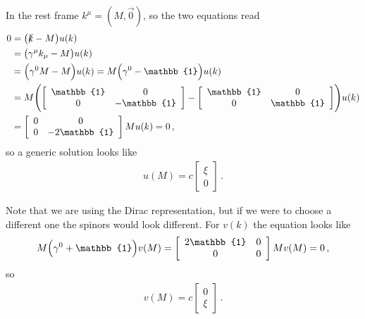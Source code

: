 \documentclass[main.tex]{subfiles}
\begin{document}
In the rest frame \(k^{\mu } = (M, \vec{0})\), so the two equations read 
%
\begin{subequations}
\begin{align}
0&= \qty(\slashed{k} - M) u(k)  \\
&= \qty(\gamma^{\mu }k_{\mu } - M) u(k)  \\
&= \qty(\gamma^{0} M - M ) u(k) = M \qty(\gamma^{0} - \mathbb{1}) u(k)  \\
&=M\qty( \left[\begin{array}{cc}
\mathbb{1} & 0 \\ 
0 & -\mathbb{1}
\end{array}\right] 
-
\left[\begin{array}{cc}
\mathbb{1} & 0 \\ 
0 & \mathbb{1}
\end{array}\right]
) u(k)  \\
&= \left[\begin{array}{cc}
0 & 0 \\ 
0 & -2 \mathbb{1}
\end{array}\right] M u(k) =0
\,,
\end{align}
\end{subequations}
%
so a generic solution looks like 
%
\begin{subequations}
\begin{align}
u(M) = c \left[\begin{array}{c}
\xi  \\ 
0
\end{array}\right]
\,.
\end{align}
\end{subequations}

Note that we are using the Dirac representation, but if we were to choose a different one the spinors would look different. 
For \(v(k)\) the equation looks like 
%
\begin{subequations}
\begin{align}
M \qty(\gamma^{0} + \mathbb{1}) v(M) =
\left[\begin{array}{cc}
2 \mathbb{1} & 0 \\ 
0 & 0
\end{array}\right] M v(M) = 0
\,,
\end{align}
\end{subequations}
%
so 
%
\begin{subequations}
\begin{align}
v(M) = c \left[\begin{array}{c}
0 \\ 
\xi 
\end{array}\right]
\,.
\end{align}
\end{subequations}
\end{document}
